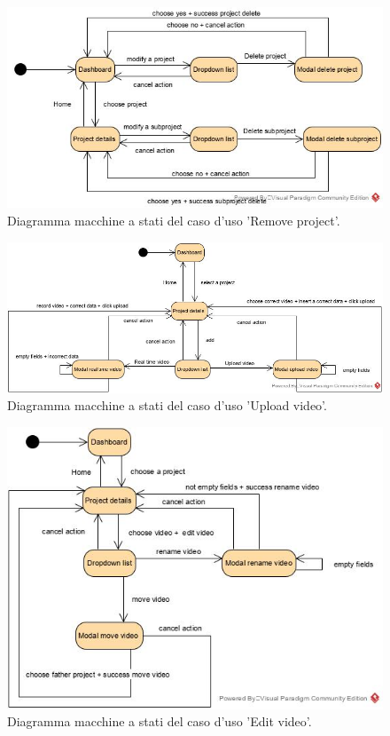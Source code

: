 \begin{figure}[H]
	\centering
	\caption{Diagramma macchine a stati del caso d'uso 'Remove project'.}
	\label{fig:diagramma-macchine-stati:remove-project}
	\includegraphics[width=\textwidth]{images/diagramma-macchine-stati/remove-project}
\end{figure}

\begin{figure}[H]
	\centering
	\caption{Diagramma macchine a stati del caso d'uso 'Upload video'.}
	\label{fig:diagramma-macchine-stati:upload-video}
	\includegraphics[width=\textwidth]{images/diagramma-macchine-stati/upload-video}
\end{figure}

\begin{figure}[H]
	\centering
	\caption{Diagramma macchine a stati del caso d'uso 'Edit video'.}
	\label{fig:diagramma-macchine-stati:edit-video}
	\includegraphics[width=\textwidth]{images/diagramma-macchine-stati/edit-video}
\end{figure}

